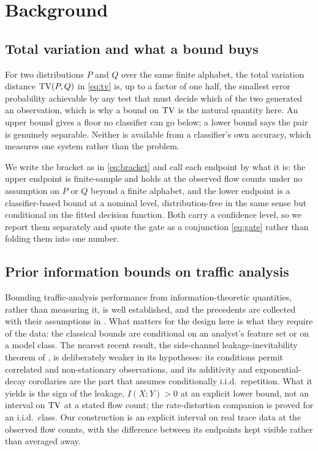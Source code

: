 \section{Background}
\label{sec:background}

\subsection{Total variation and what a bound buys}
\label{sec:background/tv}

For two distributions $P$ and $Q$ over the same finite alphabet, the total
variation distance $\mathrm{TV}(P,Q)$ in \eqref{eq:tv} is, up to a factor of one half,
the smallest error probability achievable by any test that must decide which of
the two generated an observation, which is why a bound on $\mathrm{TV}$ is the natural
quantity here. An upper bound gives a floor no classifier can go below; a lower
bound says the pair is genuinely separable. Neither is available from a
classifier's own accuracy, which measures one system rather than the problem.

We write the bracket as in \eqref{eq:bracket} and call each endpoint by what it
is: the upper endpoint is finite-sample and holds at the observed flow counts
under no assumption on $P$ or $Q$ beyond a finite alphabet, and the lower
endpoint is a classifier-based bound at a nominal level, distribution-free in
the same sense but conditional on the fitted decision function. Both carry a
confidence level, so we report them separately and quote the gate as a
conjunction \eqref{eq:gate} rather than folding them into one number.

\subsection{Prior information bounds on traffic analysis}
\label{sec:background/prior}

Bounding traffic-analysis performance from information-theoretic quantities,
rather than measuring it, is well established, and the precedents are collected
with their assumptions in . What matters for the design
here is what they require of the data: the classical bounds are conditional on an
analyst's feature set or on a model class. The nearest recent result, the
side-channel leakage-inevitability theorem of \citet{liu2026inevitability},
is deliberately weaker in its hypotheses: its conditions permit correlated and
non-stationary observations, and its additivity and exponential-decay corollaries
are the part that assumes conditionally i.i.d.\ repetition. What it yields is the
sign of the leakage, $I(X;Y)>0$ at an explicit lower bound, not an interval on
$\mathrm{TV}$ at a stated flow count; the rate-distortion companion
\citep{liu2026rate} is proved for an i.i.d.\ class. Our construction is an
explicit interval on real trace data at the observed flow counts, with the
difference between its endpoints kept visible rather than averaged away.

